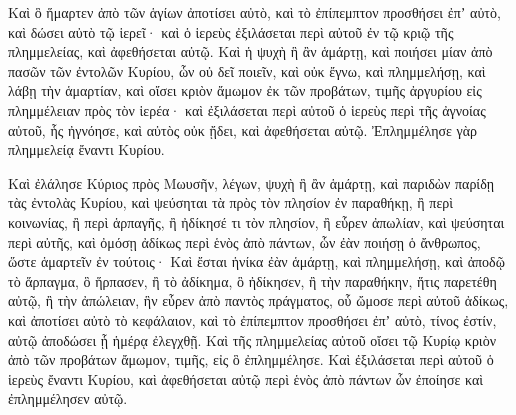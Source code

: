 {Καὶ ὃ ἥμαρτεν ἀπὸ τῶν ἁγίων ἀποτίσει αὐτὸ, καὶ τὸ ἐπίπεμπτον προσθήσει ἐπʼ αὐτὸ, καὶ δώσει αὐτὸ τῷ ἱερεῖ· καὶ ὁ ἱερεὺς ἐξιλάσεται περὶ αὐτοῦ ἐν τῷ κριῷ τῆς πλημμελείας, καὶ ἀφεθήσεται αὐτῷ.
Καὶ ἡ ψυχὴ ἣ ἂν ἁμάρτῃ, καὶ ποιήσει μίαν ἀπὸ πασῶν τῶν ἐντολῶν Κυρίου, ὧν οὐ δεῖ ποιεῖν, καὶ οὐκ ἔγνω, καὶ πλημμελήσῃ, καὶ λάβῃ τὴν ἁμαρτίαν,
καὶ οἴσει κριὸν ἄμωμον ἐκ τῶν προβάτων, τιμῆς ἀργυρίου εἰς πλημμέλειαν πρὸς τὸν ἱερέα· καὶ ἐξιλάσεται περὶ αὐτοῦ ὁ ἱερεὺς περὶ τῆς ἀγνοίας αὐτοῦ, ἧς ἠγνόησε, καὶ αὐτὸς οὐκ ᾔδει, καὶ ἀφεθήσεται αὐτῷ.
Ἐπλημμέλησε γὰρ πλημμελείᾳ ἔναντι Κυρίου.
\par }{\PP {}Καὶ ἐλάλησε Κύριος πρὸς Μωυσῆν, λέγων,
ψυχὴ ἣ ἂν ἁμάρτῃ, καὶ παριδὼν παρίδῃ τὰς ἐντολὰς Κυρίου, καὶ ψεύσηται τὰ πρὸς τὸν πλησίον ἐν παραθήκῃ, ἢ περὶ κοινωνίας, ἢ περὶ ἁρπαγῆς, ἢ ἠδίκησέ τι τὸν πλησίον,
ἢ εὗρεν ἀπωλίαν, καὶ ψεύσηται περὶ αὐτῆς, καὶ ὀμόσῃ ἀδίκως περὶ ἑνὸς ἀπὸ πάντων, ὧν ἐὰν ποιήσῃ ὁ ἄνθρωπος, ὥστε ἁμαρτεῖν ἐν τούτοις·
Καὶ ἔσται ἡνίκα ἐὰν ἁμάρτῃ, καὶ πλημμελήσῃ, καὶ ἀποδῷ τὸ ἅρπαγμα, ὃ ἥρπασεν, ἢ τὸ ἀδίκημα, ὃ ἠδίκησεν, ἢ τὴν παραθήκην, ἥτις παρετέθη αὐτῷ, ἢ τὴν ἀπώλειαν, ἣν εὗρεν
ἀπὸ παντὸς πράγματος, οὗ ὤμοσε περὶ αὐτοῦ ἀδίκως, καὶ ἀποτίσει αὐτὸ τὸ κεφάλαιον, καὶ τὸ ἐπίπεμπτον προσθήσει ἐπʼ αὐτὸ, τίνος ἐστίν, αὐτῷ ἀποδώσει ᾗ ἡμέρᾳ ἐλεγχθῇ.
Καὶ τῆς πλημμελείας αὐτοῦ οἴσει τῷ Κυρίῳ κριὸν ἀπὸ τῶν προβάτων ἄμωμον, τιμῆς, εἰς ὃ ἐπλημμέλησε.
Καὶ ἐξιλάσεται περὶ αὐτοῦ ὁ ἱερεὺς ἔναντι Κυρίου, καὶ ἀφεθήσεται αὐτῷ περὶ ἑνὸς ἀπὸ πάντων ὧν ἐποίησε καὶ ἐπλημμέλησεν αὐτῷ.

}
